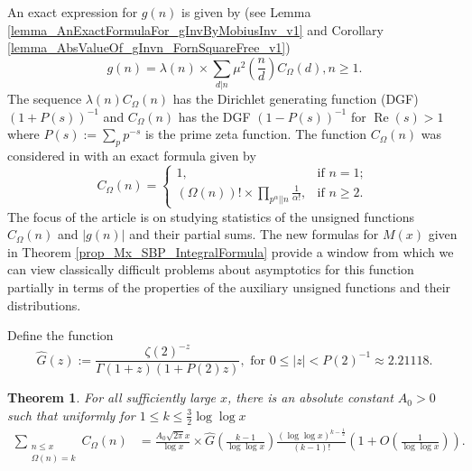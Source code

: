 \documentclass[11pt,reqno,a4letter]{article}
\newcommand{\hlocalref}[1]{\hyperref[#1]{\ref{#1}}}
\numberwithin{equation}{section}
\numberwithin{figure}{section}
\numberwithin{table}{section}
\newcommand{\cf}{\textit{cf.\ }}
\theoremstyle{plain}
\newtheorem{theorem}{Theorem}
\numberwithin{theorem}{section}
\theoremstyle{definition}
\renewcommand{\Re}{\operatorname{Re}}
\begin{document}
An exact expression for $g(n)$ is given by 
(see Lemma \hlocalref{lemma_AnExactFormulaFor_gInvByMobiusInv_v1} and 
Corollary \hlocalref{lemma_AbsValueOf_gInvn_FornSquareFree_v1}) 
\begin{equation}
\label{eqn_gInvn_ExactDivisorSumFormula_WithSgnWeight_v1} 
g(n) = \lambda(n) \times \sum_{d|n} \mu^2\left(\frac{n}{d}\right) C_{\Omega}(d), n \geq 1. 
\end{equation}
The sequence $\lambda(n) C_{\Omega}(n)$ has the 
Dirichlet generating function (DGF) $(1 + P(s))^{-1}$ and 
$C_{\Omega}(n)$ has the DGF $(1-P(s))^{-1}$ for $\Re(s) > 1$ 
where $P(s) := \sum_p p^{-s}$ is the prime zeta function. 
The function $C_{\Omega}(n)$ was considered in 
\cite{FROBERG-1968} with an exact formula 
given by \cite[\cf \S 3]{CLT-RANDOM-ORDERED-FACTS-2011} 
\begin{equation}
\label{eqn_proof_tag_hInvn_ExactNestedSumFormula_CombInterpetIdent_v3}
C_{\Omega}(n) = \begin{cases}
     1, & \text{if $n = 1$; } \\ 
     (\Omega(n))! \times \prod\limits_{p^{\alpha}||n} \frac{1}{\alpha!}, & \text{if $n \geq 2$. }
     \end{cases}
\end{equation} 
The focus of the article is on studying statistics of the unsigned functions 
$C_{\Omega}(n)$ and $|g(n)|$ and their partial sums. 
The new formulas for $M(x)$ given in 
Theorem \hlocalref{prop_Mx_SBP_IntegralFormula} 
provide a window from which we can view classically  
difficult problems about asymptotics for this function partially in terms of the 
properties of the auxiliary unsigned functions and their distributions. 

Define the function 
\[
\widehat{G}(z) := \frac{\zeta(2)^{-z}}{\Gamma(1+z) (1+P(2)z)}, \text{ for } 
     0 \leq |z| < P(2)^{-1} \approx 2.21118.
\]

\begin{theorem} 
\label{cor_SummatoryFuncsOfUnsignedSeqs_v2} 
For all sufficiently large $x$, there is an absolute constant $A_0 > 0$ such that 
uniformly for $1 \leq k \leq \frac{3}{2} \log\log x$  
\begin{align*} 
\sum_{\substack{n \leq x \\ \Omega(n)=k}} C_{\Omega}(n) & = 
     \frac{A_0 \sqrt{2\pi} x}{\log x} \times  
     \widehat{G}\left(\frac{k-1}{\log\log x}\right) 
     \frac{(\log\log x)^{k-\frac{1}{2}}}{(k-1)!} \left( 
     1 + O\left(\frac{1}{\log\log x}\right)\right). 
\end{align*} 
\end{theorem} 
\end{document}
